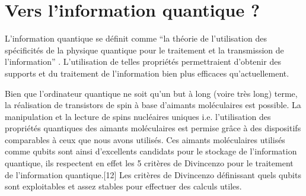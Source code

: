 \section{Vers l'information quantique ?}

L'information quantique se définit comme “la théorie de l'utilisation des spécificités de la physique quantique pour le traitement et la transmission de l'information” \cite{18}. L'utilisation de telles propriétés permettraient d'obtenir des supports et du traitement de l'information bien plus efficaces qu'actuellement.

Bien que l'ordinateur quantique ne soit qu'un but à long (voire très long) terme, la réalisation de transistors de spin à base d'aimants moléculaires est possible. La manipulation et la lecture de spins nucléaires uniques i.e. l'utilisation des propriétés quantiques des aimants moléculaires est permise grâce à des dispositifs comparables à ceux que nous avons utilisés. Ces aimants moléculaires utilisés comme qubits sont ainsi d'excellents candidats pour le stockage de l'information quantique, ils respectent en effet les 5 critères de Divincenzo pour le traitement de l'information quantique.[12] Les critères de Divincenzo définissant quels qubits sont exploitables et assez stables pour effectuer des calculs utiles.
